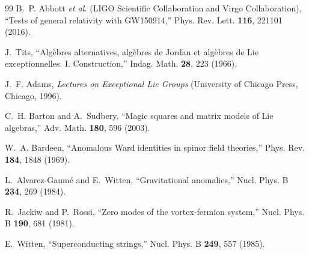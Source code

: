 \documentclass[aps,prd,preprint,longbibliography,nofootinbib,superscriptaddress,floatfix]{revtex4-2}
\begin{document}
\begin{thebibliography}{99}
B.~P. Abbott \textit{et al.} (LIGO Scientific Collaboration and Virgo Collaboration),
``Tests of general relativity with GW150914,''
Phys. Rev. Lett. \textbf{116}, 221101 (2016).

J.~Tits,
``Alg\`ebres alternatives, alg\`ebres de Jordan et alg\`ebres de Lie
exceptionnelles. I. Construction,''
Indag. Math. \textbf{28}, 223 (1966).

J.~F. Adams,
\textit{Lectures on Exceptional Lie Groups}
(University of Chicago Press, Chicago, 1996).

C.~H. Barton and A.~Sudbery,
``Magic squares and matrix models of Lie algebras,''
Adv. Math. \textbf{180}, 596 (2003).

W.~A. Bardeen,
``Anomalous Ward identities in spinor field theories,''
Phys. Rev. \textbf{184}, 1848 (1969).

L.~Alvarez-Gaum\'e and E.~Witten,
``Gravitational anomalies,''
Nucl. Phys. B \textbf{234}, 269 (1984).

R.~Jackiw and P.~Rossi,
``Zero modes of the vortex-fermion system,''
Nucl. Phys. B \textbf{190}, 681 (1981).

E.~Witten,
``Superconducting strings,''
Nucl. Phys. B \textbf{249}, 557 (1985).

\end{thebibliography}
\end{document}
